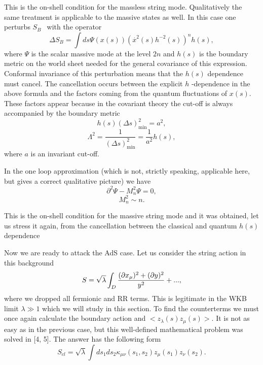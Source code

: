 \documentclass[a4paper,12pt]{article}
\begin{document}
This is the on-shell condition for the massless string mode. Qualitatively
the same treatment is applicable to the massive states as well. In this case
one perturbs $S_{B\text{ }}$ with the operator 
\begin{equation}
\Delta S_{B}=\int ds\Psi (x(s))(\overset{.}{x}^{2}(s)h^{-2}(s))^{n}h(s),
\end{equation}
where $\Psi $ is the scalar massive mode at the level $2n$ and $h(s)$ is the
boundary metric on the world sheet needed for the general covariance of this
expression. Conformal invariance of this perturbation means that the $h(s)$
dependence must cancel. The cancellation occurs between the explicit $h$
-dependence in the above formula and the factors coming from the quantum
fluctuations of $x(s)$. These factors appear because in the covariant theory
the cut-off is always accompanied by the boundary metric 
\begin{equation}
h(s)(\Delta s)_{\min }^{2}=a^{2},
\end{equation}
\begin{equation}
\Lambda ^{2}=\frac{1}{(\Delta s)_{\min }^{2}}=\frac{1}{a^{2}}h(s),
\end{equation}
where $a$ is an invariant cut-off.

In the one loop approximation (which is not, strictly speaking, applicable
here, but gives a correct qualitative picture) we have 
\begin{equation}
\partial ^{2}\Psi -M_{n}^{2}\Psi =0,
\end{equation}
\begin{equation}
M_{n}^{2}\sim n.
\end{equation}

This is the on-shell condition for the massive string mode and it was
obtained, let us stress it again, from the cancellation between the
classical and quantum $h(s)$ dependence

Now we are ready to attack the AdS case. Let us consider the string action
in this background 
\begin{equation}
S=\sqrt{\lambda }\int_{D}\frac{(\partial x_{\mu })^{2}+(\partial y)^{2}}{%
y^{2}}+...,
\end{equation}
where we dropped all fermionic and RR terms. This is legitimate in the WKB
limit $\lambda \gg 1$ which we will study in this section. To find the
counterterms we must once again calculate the boundary action and $%
<z_{\lambda }(s)z_{\mu }(s)>$. It is not as easy as in the previous case,
but this well-defined mathematical problem was solved in [4, 5]. The answer
has the following form 
\begin{equation}
S_{cl}=\sqrt{\lambda }\int ds_{1}ds_{2}\kappa _{\mu \nu }(s_{1},s_{2})z_{\mu
}(s_{1})z_{\nu }(s_{2}).
\end{equation}
\end{document}
